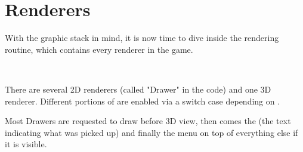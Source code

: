 \section{Renderers}
With the graphic stack in mind, it is now time to dive inside the rendering routine,  which contains every renderer in the game.\\
\par
{}\\
\par
 There are several 2D renderers (called "Drawer" in the code) and one 3D renderer. Different portions of  are enabled via a switch case depending on .\\
 \par
  Most Drawers are requested to draw before 3D view, then comes the  (the text indicating what was picked up) and finally the menu on top of everything else if it is visible.
